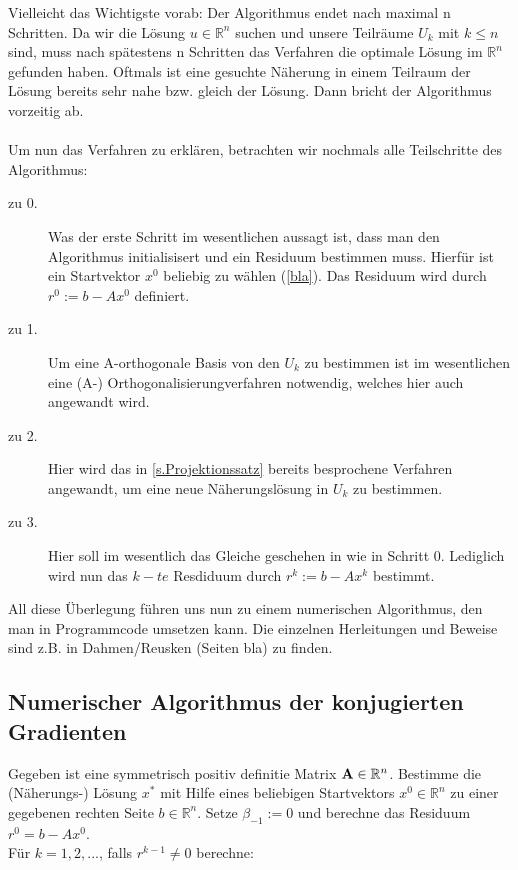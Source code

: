 Vielleicht das Wichtigste vorab: Der Algorithmus endet nach maximal n Schritten. Da wir die Lösung $u \in \mathbb{R}^{n}$ suchen und unsere Teilräume $U_{k}$ mit $k \le n$ sind, muss nach spätestens n Schritten das Verfahren die optimale Lösung im $\mathbb{R}^{n}$  gefunden haben. Oftmals ist eine gesuchte Näherung in einem Teilraum der Lösung bereits sehr nahe bzw. gleich der Lösung. Dann bricht der Algorithmus vorzeitig ab. \\ \\
Um nun das Verfahren zu erklären, betrachten wir nochmals alle Teilschritte des Algorithmus:
\begin{description}

\item[zu 0.] Was der erste Schritt im wesentlichen aussagt ist, dass man den Algorithmus initialisisert und ein Residuum bestimmen muss. Hierfür ist ein Startvektor $x^{0}$ beliebig zu wählen (\autoref{bla}). Das Residuum wird durch $r^{0} := b - Ax^{0}$ definiert.

\item[zu 1.] Um eine A-orthogonale Basis von den $U_{k}$ zu bestimmen ist im wesentlichen eine (A-) Orthogonalisierungverfahren notwendig, welches hier auch angewandt wird.

\item[zu 2.] Hier wird das in \autoref{s.Projektionssatz} bereits besprochene Verfahren angewandt, um eine neue Näherungslösung in $U_{k}$ zu bestimmen.

\item[zu 3.] Hier soll im wesentlich das Gleiche geschehen in wie in Schritt 0. Lediglich wird nun das $k-te$ Resdiduum durch $r^{k} := b - Ax^{k}$ bestimmt.

\end{description}

All diese Überlegung führen uns nun zu einem numerischen Algorithmus, den man in Programmcode umsetzen kann. Die einzelnen Herleitungen und Beweise sind z.B. in Dahmen/Reusken (Seiten bla) zu finden.

\subsection{Numerischer Algorithmus der konjugierten Gradienten}

Gegeben ist eine symmetrisch positiv definitie Matrix ${\textbf{A}} \in \mathbb{R}^{n}$. Bestimme die (Näherungs-) Lösung $x^{*}$ mit Hilfe eines beliebigen Startvektors $x^{0} \in \mathbb{R}^{n}$ zu einer gegebenen rechten Seite $b \in \mathbb{R}^{n}$. Setze $\beta_{-1} := 0$ und berechne das Residuum $r^{0} = b - Ax^{0}$. \\
Für $k = 1,2,...$, falls $r^{k-1} \ne 0$ berechne:

